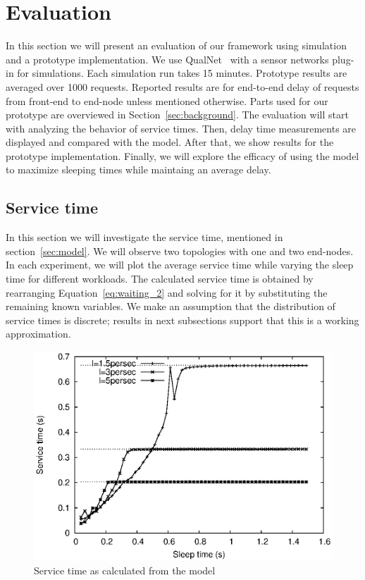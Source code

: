 \section{Evaluation}

In this section we will present an evaluation of our framework using simulation and a prototype implementation. We use QualNet~\cite{16} with a sensor networks plug-in for simulations. Each simulation run takes 15 minutes. Prototype results are averaged over 1000 requests. Reported results are for end-to-end delay of requests from front-end to end-node unless mentioned otherwise. Parts used for our prototype are overviewed in Section~\ref{sec:background}. The evaluation will start with analyzing the behavior of service times. Then, delay time measurements are displayed and compared with the model. After that, we show results for the prototype implementation. Finally, we will explore the efficacy of using the model to maximize sleeping times while maintaing an average delay.

\subsection{Service time}
In this section we will investigate the service time, mentioned in section~\ref{sec:model}. We will observe two topologies with one and two end-nodes. In each experiment, we will plot the average service time while varying the sleep time for different workloads. The calculated service time is obtained by rearranging Equation~\ref{eq:waiting_2} and solving for it by substituting the remaining known variables. We make an assumption that the distribution of service times is discrete; results in next subsections support that this is a working approximation. 

\begin{figure}[t]
\centering
\includegraphics[scale=0.65]{figures/3node_varySleep_sim_x.eps}
\caption{Service time as calculated from the model}
\label{fig:3nodes_x}
\end{figure}

